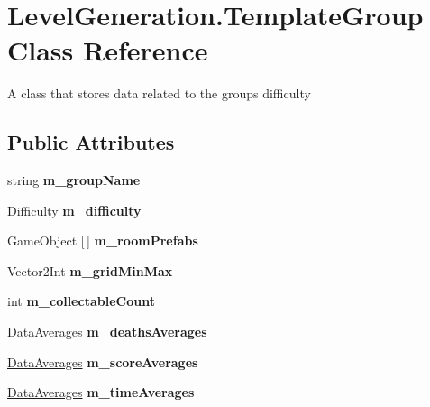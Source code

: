 \hypertarget{class_level_generation_1_1_template_group}{}\section{Level\+Generation.\+Template\+Group Class Reference}
\label{class_level_generation_1_1_template_group}


A class that stores data related to the groups difficulty  


\subsection*{Public Attributes}
\begin{DoxyCompactItemize}
\item 
\mbox{\label{class_level_generation_1_1_template_group_ae5ff3aa455059ea023fe9914b261f464}} 
string {\bfseries m\+\_\+group\+Name}
\item 
\mbox{\label{class_level_generation_1_1_template_group_af8fe8d7ab9c3f9904d5b3a51134a3dc4}} 
Difficulty {\bfseries m\+\_\+difficulty}
\item 
\mbox{\label{class_level_generation_1_1_template_group_a08669e71dc903a1dd580affa2b8fe4f3}} 
Game\+Object \mbox{[}$\,$\mbox{]} {\bfseries m\+\_\+room\+Prefabs}
\item 
\mbox{\label{class_level_generation_1_1_template_group_a51b2ad45dad9e7297bd0a5107a31cf8c}} 
Vector2\+Int {\bfseries m\+\_\+grid\+Min\+Max}
\item 
\mbox{\label{class_level_generation_1_1_template_group_adcfec59890e32f28d0e6850eb4fc4bbf}} 
int {\bfseries m\+\_\+collectable\+Count}
\item 
\mbox{\label{class_level_generation_1_1_template_group_ac9df41e2a7437e8b8890eb077afe61d7}} 
\mbox{\hyperlink{struct_level_generation_1_1_data_averages}{Data\+Averages}} {\bfseries m\+\_\+deaths\+Averages}
\item 
\mbox{\label{class_level_generation_1_1_template_group_a20a0ae17362f673fc6e4115eda6ff3d2}} 
\mbox{\hyperlink{struct_level_generation_1_1_data_averages}{Data\+Averages}} {\bfseries m\+\_\+score\+Averages}
\item 
\mbox{\label{class_level_generation_1_1_template_group_aa6aeb32ba96b0de00f326d136b5a9abf}} 
\mbox{\hyperlink{struct_level_generation_1_1_data_averages}{Data\+Averages}} {\bfseries m\+\_\+time\+Averages}
\end{DoxyCompactItemize}


